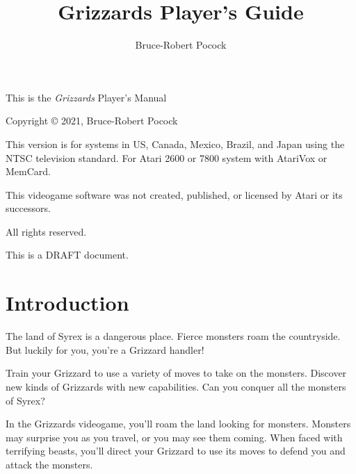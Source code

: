 \documentclass[12pt,twoside,openright,book]{memoir}
\title{Grizzards Player's Guide}
\author{Bruce-Robert Pocock}
\makeatletter
\newcommand\TV{NTSC}
\newcommand\REGION{US, Canada, Mexico, Brazil, and Japan}
\newcommand\TV{PAL}
\newcommand\REGION{UK and Europe (except France)}
\newcommand\TV{SECAM}
\newcommand\REGION{France, Russia, Africa}
\def\maketitle{%
  \null
  \thispagestyle{empty}%
  \vfill
  \begin{center}\leavevmode
    \normalfont
    {\LARGE\raggedleft \@author\par}%
    \hrulefill\par
    {\huge\raggedright \@title\par}%
    \vskip 1cm
  \end{center}%
  \vfill
  \null
  \cleardoublepage
  }
\makeatother
\begin{document}


\maketitle

\frontmatter

\null\vfill

\begin{flushleft}
This is the \textit{Grizzards} Player's Manual

Copyright \copyright{} 2021, Bruce-Robert Pocock

\bigskip

This version is for systems in \REGION{} using the \TV{} television
standard. For Atari 2600 or 7800 system with AtariVox or MemCard.

\bigskip

This videogame software was not created, published, or licensed by Atari
or its successors.

\bigskip

\thedate

\bigskip

All rights reserved.

\bigskip

This is a DRAFT document.

\end{flushleft}
\let\cleardoublepage\clearpage

\mainmatter

\chapter{Introduction}\label{Introduction}

The  land of  Syrex  is  a dangerous  place.  Fierce  monsters roam  the
countryside. But luckily for you, you're a Grizzard handler!

Train your Grizzard to  use a variety of moves to  take on the monsters.
Discover new kinds  of Grizzards with new capabilities.  Can you conquer
all the monsters of Syrex?

In the Grizzards  videogame, you'll roam the land  looking for monsters.
Monsters may  surprise you as  you travel, or  you may see  them coming.
When faced  with terrifying beasts,  you'll direct your Grizzard  to use
its moves to defend you and attack the monsters.

\cleardoublepage

\tableofcontents
\end{document}

